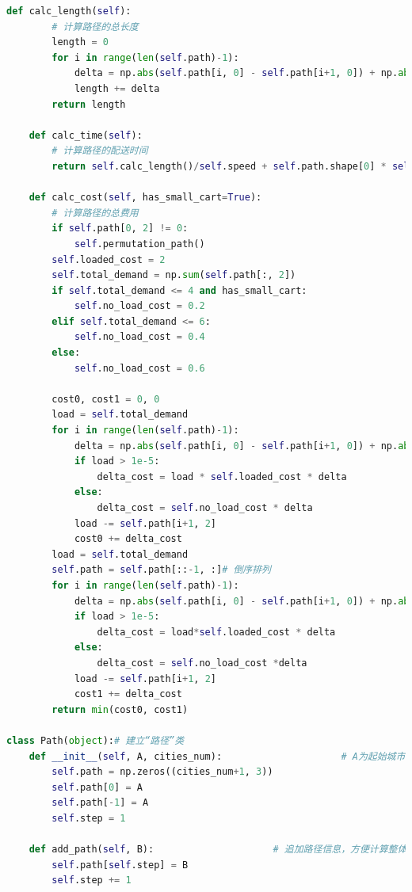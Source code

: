 \documentclass{cumcmthesis}
\begin{document}
\begin{appendices}
\begin{lstlisting}[language=Python]
    def calc_length(self):
        # 计算路径的总长度
        length = 0
        for i in range(len(self.path)-1):
            delta = np.abs(self.path[i, 0] - self.path[i+1, 0]) + np.abs(self.path[i, 1] - self.path[i+1, 1])
            length += delta
        return length

    def calc_time(self):
        # 计算路径的配送时间
        return self.calc_length()/self.speed + self.path.shape[0] * self.unload_time

    def calc_cost(self, has_small_cart=True):
        # 计算路径的总费用
        if self.path[0, 2] != 0:
            self.permutation_path()
        self.loaded_cost = 2
        self.total_demand = np.sum(self.path[:, 2])
        if self.total_demand <= 4 and has_small_cart:
            self.no_load_cost = 0.2
        elif self.total_demand <= 6:
            self.no_load_cost = 0.4
        else:
            self.no_load_cost = 0.6

        cost0, cost1 = 0, 0
        load = self.total_demand
        for i in range(len(self.path)-1):
            delta = np.abs(self.path[i, 0] - self.path[i+1, 0]) + np.abs(self.path[i, 1] - self.path[i+1, 1])
            if load > 1e-5:
                delta_cost = load * self.loaded_cost * delta
            else:
                delta_cost = self.no_load_cost * delta
            load -= self.path[i+1, 2]
            cost0 += delta_cost
        load = self.total_demand
        self.path = self.path[::-1, :]# 倒序排列
        for i in range(len(self.path)-1):
            delta = np.abs(self.path[i, 0] - self.path[i+1, 0]) + np.abs(self.path[i, 1] - self.path[i+1, 1])
            if load > 1e-5:
                delta_cost = load*self.loaded_cost * delta
            else:
                delta_cost = self.no_load_cost *delta
            load -= self.path[i+1, 2]
            cost1 += delta_cost
        return min(cost0, cost1)

class Path(object):# 建立“路径”类
    def __init__(self, A, cities_num):                     # A为起始城市
        self.path = np.zeros((cities_num+1, 3))
        self.path[0] = A
        self.path[-1] = A
        self.step = 1

    def add_path(self, B):                     # 追加路径信息，方便计算整体路径长度
        self.path[self.step] = B
        self.step += 1
\end{lstlisting}
\end{appendices}
\end{document}
